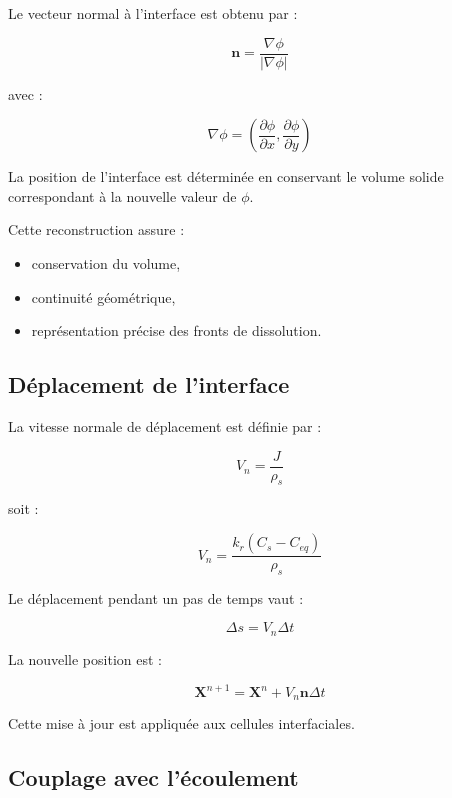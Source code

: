 \documentclass[12pt,a4paper]{report}
\begin{document}
Le vecteur normal à l’interface est obtenu par :

\begin{equation}
\mathbf{n}
=
\frac{\nabla \phi}{|\nabla \phi|}
\end{equation}

avec :

\begin{equation}
\nabla \phi
=
\left(
\frac{\partial \phi}{\partial x},
\frac{\partial \phi}{\partial y}
\right)
\end{equation}

La position de l’interface est déterminée en conservant le volume solide correspondant à la nouvelle valeur de $\phi$.

Cette reconstruction assure :

\begin{itemize}
\item conservation du volume,
\item continuité géométrique,
\item représentation précise des fronts de dissolution.
\end{itemize}

\subsection{Déplacement de l’interface}

La vitesse normale de déplacement est définie par :

\begin{equation}
V_n
=
\frac{J}{\rho_s}
\end{equation}

soit :

\begin{equation}
V_n
=
\frac{k_r(C_s-C_{eq})}{\rho_s}
\end{equation}

Le déplacement pendant un pas de temps vaut :

\begin{equation}
\Delta s
=
V_n \Delta t
\end{equation}

La nouvelle position est :

\begin{equation}
\mathbf{X}^{n+1}
=
\mathbf{X}^{n}
+
V_n \mathbf{n}\Delta t
\end{equation}

Cette mise à jour est appliquée aux cellules interfaciales.

\subsection{Couplage avec l’écoulement}
\end{document}
